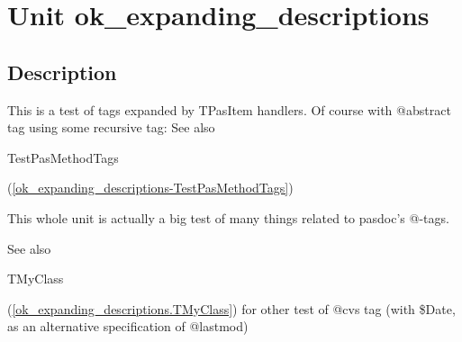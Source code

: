 \documentclass{report}
\begin{document}
\chapter{Unit ok{\_}expanding{\_}descriptions}
\section{Description}
This is a test of tags expanded by TPasItem handlers. Of course with @abstract tag using some recursive tag: See also \begin{ttfamily}TestPasMethodTags\end{ttfamily}(\ref{ok_expanding_descriptions-TestPasMethodTags})\hfill\vspace*{1ex}



This whole unit is actually a big test of many things related to pasdoc's @{-}tags.

   

See also \begin{ttfamily}TMyClass\end{ttfamily}(\ref{ok_expanding_descriptions.TMyClass}) for other test of @cvs tag (with {\$}Date, as an alternative specification of @lastmod)
\end{document}
